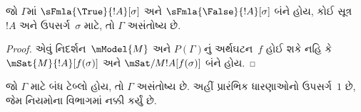 \begin{prop}
  જો $\Gamma$માં $\sFmla{\True}{!A}[\sigma]$ અને
  $\sFmla{\False}{!A}[\sigma]$ બંને હોય, કોઈ સૂત્ર~$!A$
  અને ઉપસર્ગ~$\sigma$ માટે, તો $\Gamma$ અસંતોષ્ય છે.
\end{prop}

\begin{proof}
  એવું નિદર્શન~$\mModel{M}$ અને $P(\Gamma)$નું અર્થઘટન~$f$
  હોઈ શકે નહિ કે $\mSat{M}{!A}[f(\sigma)]$ અને
  $\mSat/{M}{!A}[f(\sigma)]$ બંને હોય.
\end{proof}

\begin{thm}[યથાર્થતા]
  જો $\Gamma$ માટે બંધ ટેબ્લો હોય, તો $\Gamma$ અસંતોષ્ય છે.
  અહીં પ્રારંભિક ધારણાઓનો ઉપસર્ગ~$1$ છે, જેમ
  નિયમોના વિભાગમાં નક્કી કર્યું છે.
\end{thm}

